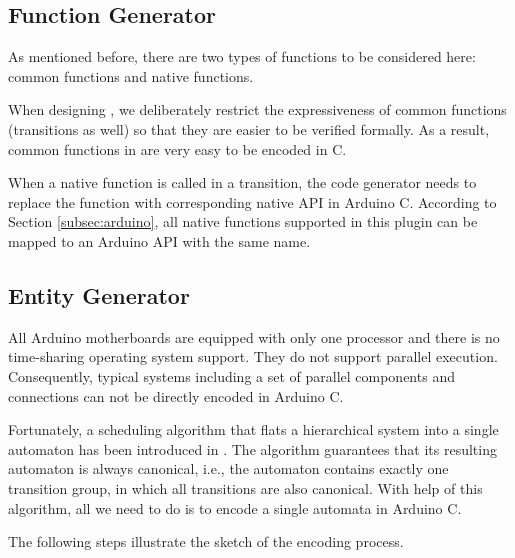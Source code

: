 \subsection{Function Generator}

As mentioned before, there are two types of functions to be considered here: common functions and native functions.

 When designing \lang{}, we deliberately restrict the expressiveness of common functions (transitions as well) so that they are easier to be verified formally. As a result, common functions in \lang{} are very easy to be encoded in C.

 When a native function is called in a transition, the code generator needs to replace the function with corresponding native API in Arduino C. According to Section \ref{subsec:arduino}, all native functions supported in this plugin can be mapped to an Arduino API with the same name.

\subsection{Entity Generator}

All Arduino motherboards are equipped with only one processor and there is no time-sharing operating system support. They do not support parallel execution. Consequently, typical \lang{} systems including a set of parallel components and connections can not be directly encoded in Arduino C.

Fortunately, a scheduling algorithm that flats a hierarchical system into a single automaton has been introduced in \cite{LiFacsMediator2017}. The algorithm guarantees that its resulting automaton is always canonical, i.e., the automaton 
contains exactly one transition group, in which all transitions are also canonical. With help of this algorithm, all we 
need to do is to encode a single \lang{} automata in Arduino C. 

The following steps illustrate the sketch of the encoding process.

